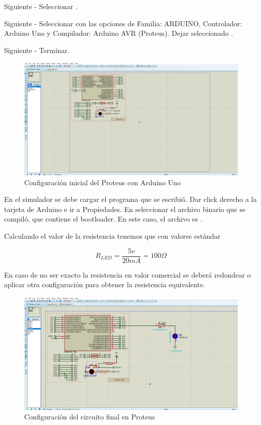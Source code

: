 \documentclass{article}
\begin{document}
\bigbreak

Siguiente - Seleccionar .

\bigbreak

Siguiente - Seleccionar  con las opciones de Familia: ARDUINO, Controlador: 
Arduino Uno y Compilador: Arduino AVR (Proteus). Dejar seleccionado .

\bigbreak

Siguiente - Terminar.

\begin{figure}[H]
    \centering
    \includegraphics[width=0.5\paperwidth]{images/sim-1.png}
    \caption{Configuración inicial del Proteus con Arduino Uno}
\end{figure}

En el simulador se debe cargar el programa que se escribió. Dar click derecho a la tarjeta de Arduino e ir a
Propiedades. En  seleccionar el archivo binario que se compiló, que contiene el bootloader.
En este caso, el archivo es .

\bigbreak

Calculando el valor de la resistencia tenemos que con valores estándar

$$
R_{LED} = \frac{5v}{20mA} = 100\Omega
$$

En caso de no ser exacto la resistencia en valor comercial se deberá redondear o aplicar otra configuración para obtener la resistencia equivalente.

\begin{figure}[H]
    \centering
    \includegraphics[width=0.5\paperwidth]{images/sim-2.png}
    \caption{Configuración del circuito final en Proteus}
\end{figure}
\end{document}
